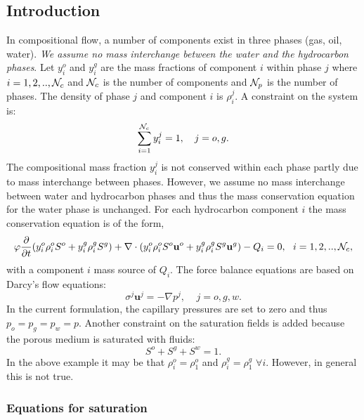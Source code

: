 \subsection{Introduction}
In compositional flow, a number of components exist in three phases (gas, oil, water).
{\it We assume no mass interchange between the water and the hydrocarbon phases}. 
Let $y_i^{o}$ and $y_i^{g}$ are the mass fractions of component $i$ 
within phase $j$ 
where $i = 1,2,..,{\cal N}_c$ and ${\cal N}_c$ is the number of components and ${\cal N}_p$ is the 
number of phases. 
The density of phase $j$ and component $i$ is $\rho_i^j$. 
A constraint on the system is: 
\begin{equation}
\sum_{i=1}^{{\cal N}_c} y_i^j = 1, ~~~ j = o,g .
\end{equation}
The compositional mass fraction $y_i^j$ is not conserved within each phase partly due to mass interchange between phases. 
However, we assume no mass interchange between water and hydrocarbon phases
and thus the mass conservation equation for the water phase is unchanged. 
For each hydrocarbon component $i$ the mass conservation
equation is of the form, 
\begin{equation}
\phi \frac{\partial}{\partial t}(y_i^o \rho_i^o S^o + y_i^g \rho_i^g S^g) + \nabla \cdot (y_i^o \rho_i^o S^o  \mathbf{u}^{o} + y_i^g \rho_i^g S^g  \mathbf{u}^{g}) - Q_i = 0, ~~i = 1,2,..,{\cal N}_c ,  
\label{saturation_2phases}
\end{equation}
with a component $i$ mass source of $Q_i$. 
The force balance equations are based on Darcy's flow equations: 
\begin{equation}
 \sigma^j {\mathbf u}^j = - \nabla p^j, ~~~~~ j = o,g,w .
\label{force-bal}
\end{equation}
In the current formulation, the capillary pressures are set to zero and thus $ p_o = p_g = p_w  = p $.
Another constraint on the saturation fields is added because the porous medium is saturated with fluids: 
\begin{equation}
 S^o + S^g + S^w = 1. 
\end{equation}
In the above example it may be that 
$\rho_i^o=\rho_1^o$ and $\rho_i^g=\rho_1^g$ $\forall i$. 
However, in general this is not true. 



\subsubsection{Equations for saturation}

